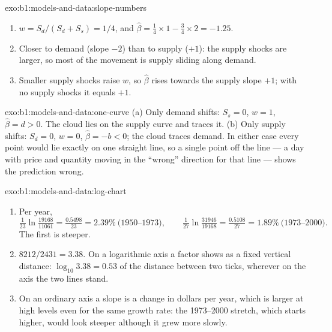 \begin{solution}{exo:b1:models-and-data:slope-numbers}
\begin{enumerate}
  \item $w = S_d/(S_d + S_s) = 1/4$, and $\hat\beta = \tfrac14 \times 1 -
    \tfrac34 \times 2 = -1.25$.
  \item Closer to demand (slope $-2$) than to supply ($+1$): the supply
    shocks are larger, so most of the movement is supply sliding along
    demand.
  \item Smaller supply shocks raise $w$, so $\hat\beta$ rises towards the
    supply slope $+1$; with no supply shocks it equals $+1$.
\end{enumerate}
\end{solution}

\begin{solution}{exo:b1:models-and-data:one-curve}
(a) Only demand shifts: $S_s = 0$, $w = 1$, $\hat\beta = d > 0$. The cloud
lies on the supply curve and traces it. (b) Only supply shifts: $S_d = 0$,
$w = 0$, $\hat\beta = -b < 0$; the cloud traces demand. In either case every
point would lie exactly on one straight line, so a single point off the
line --- a day with price and quantity moving in the ``wrong'' direction for
that line --- shows the prediction wrong.
\end{solution}

\begin{solution}{exo:b1:models-and-data:log-chart}
\begin{enumerate}
  \item Per year,
    \[
    \tfrac{1}{23}\ln\tfrac{19168}{11061} = \tfrac{0.5498}{23} = 2.39\%
    \ \text{(1950--1973)}, \qquad
    \tfrac{1}{27}\ln\tfrac{31946}{19168} = \tfrac{0.5108}{27} = 1.89\%
    \ \text{(1973--2000)}.
    \]
    The first is steeper.
  \item $8212/2431 = 3.38$. On a logarithmic axis a factor shows as a fixed
    vertical distance: $\log_{10} 3.38 = 0.53$ of the distance between two
    ticks, wherever on the axis the two lines stand.
  \item On an ordinary axis a slope is a change in dollars per year, which is
    larger at high levels even for the same growth rate: the 1973--2000
    stretch, which starts higher, would look steeper although it grew more
    slowly.
\end{enumerate}
\end{solution}

